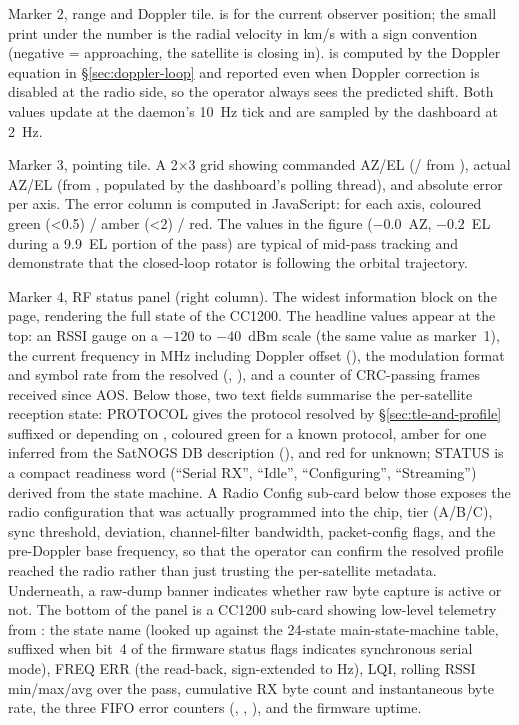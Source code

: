 Marker 2, range and Doppler tile.  is  for the current observer position; the small print under the number is the radial velocity in km/s with a sign convention (negative = approaching, the satellite is closing in).  is computed by the Doppler equation in \S\ref{sec:doppler-loop} and reported even when Doppler correction is disabled at the radio side, so the operator always sees the predicted shift. Both values update at the daemon's 10~Hz tick and are sampled by the dashboard at 2~Hz.

Marker 3, pointing tile. A 2$\times$3 grid showing commanded AZ/EL (/ from ), actual AZ/EL (from , populated by the dashboard's polling thread), and absolute error per axis. The error column is computed in JavaScript:  for each axis, coloured green (\textless 0.5\degree) / amber (\textless 2\degree) / red. The values in the figure ($-0.0$\degree\ AZ, $-0.2$\degree\ EL during a 9.9\degree\ EL portion of the pass) are typical of mid-pass tracking and demonstrate that the closed-loop rotator is following the orbital trajectory.

Marker 4, RF status panel (right column). The widest information block on the page, rendering the full state of the CC1200. The headline values appear at the top: an RSSI gauge on a $-120$ to $-40$~dBm scale (the same value as marker~1), the current frequency in MHz including Doppler offset (), the modulation format and symbol rate from the resolved  (, ), and a counter of CRC-passing frames received since AOS. Below those, two text fields summarise the per-satellite reception state: PROTOCOL gives the protocol resolved by \S\ref{sec:tle-and-profile} suffixed \code{[serial]} or \code{[pkt]} depending on , coloured green for a known protocol, amber for one inferred from the SatNOGS DB description (), and red for unknown; STATUS is a compact readiness word (``Serial RX'', ``Idle'', ``Configuring'', ``Streaming'') derived from the  state machine. A Radio Config sub-card below those exposes the radio configuration that was actually programmed into the chip, tier (A/B/C), sync threshold, deviation, channel-filter bandwidth, packet-config flags, and the pre-Doppler base frequency, so that the operator can confirm the resolved profile reached the radio rather than just trusting the per-satellite metadata. Underneath, a raw-dump banner indicates whether raw byte capture is active or not. The bottom of the panel is a CC1200 sub-card showing low-level telemetry from : the  state name (looked up against the 24-state main-state-machine table, suffixed \code{[SERIAL]} when bit~4 of the firmware status flags indicates synchronous serial mode), FREQ ERR (the  read-back, sign-extended to Hz), LQI, rolling RSSI min/max/avg over the pass, cumulative RX byte count and instantaneous byte rate, the three FIFO error counters (, , ), and the firmware uptime.

